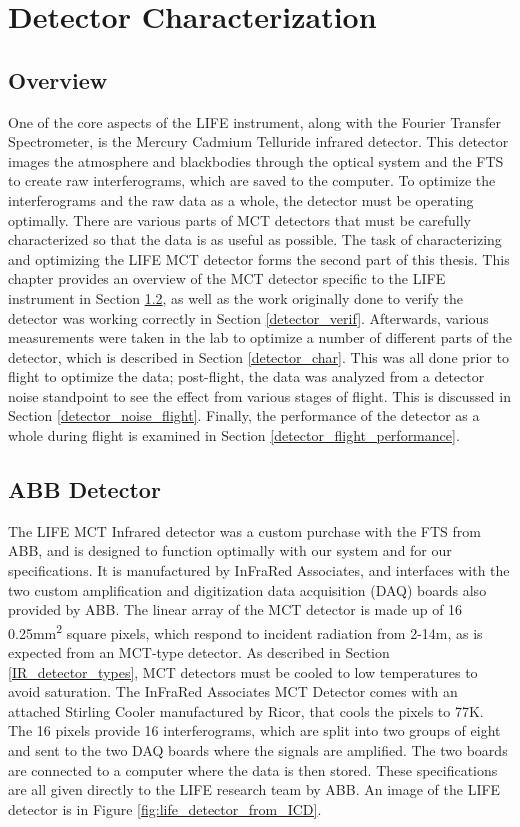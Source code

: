 \chapter{Detector Characterization} \label{detector}

\section{Overview}
One of the core aspects of the LIFE instrument, along with the Fourier Transfer Spectrometer, is the Mercury Cadmium Telluride infrared detector. This detector images the atmosphere and blackbodies through the optical system and the FTS to create raw interferograms, which are saved to the computer. To optimize the interferograms and the raw data as a whole, the detector must be operating optimally. There are various parts of MCT detectors that must be carefully characterized so that the data is as useful as possible. The task of characterizing and optimizing the LIFE MCT detector forms the second part of this thesis. This chapter provides an overview of the MCT detector specific to the LIFE instrument in Section \ref{ABB_detector}, as well as the work originally done to verify the detector was working correctly in Section \ref{detector_verif}. Afterwards, various measurements were taken in the lab to optimize a number of different parts of the detector, which is described in Section \ref{detector_char}. This was all done prior to flight to optimize the data; post-flight, the data was analyzed from a detector noise standpoint to see the effect from various stages of flight. This is discussed in Section \ref{detector_noise_flight}. Finally, the performance of the detector as a whole during flight is examined in Section \ref{detector_flight_performance}.

\section{ABB Detector}\label{ABB_detector}
The LIFE MCT Infrared detector was a custom purchase with the FTS from ABB, and is designed to function optimally with our system and for our specifications. It is manufactured by InFraRed Associates, and interfaces with the two custom amplification and digitization data acquisition (DAQ) boards also provided by ABB. The linear array of the MCT detector is made up of 16 0.25mm\textsuperscript{2} square pixels, which respond to incident radiation from 2-14\textmu m, as is expected from an MCT-type detector. As described in Section \ref{IR_detector_types}, MCT detectors must be cooled to low temperatures to avoid saturation. The InFraRed Associates MCT Detector comes with an attached Stirling Cooler manufactured by Ricor, that cools the pixels to 77K. The 16 pixels provide 16 interferograms, which are split into two groups of eight and sent to the two DAQ boards where the signals are amplified. The two boards are connected to a computer where the data is then stored. These specifications are all given directly to the LIFE research team by ABB. An image of the LIFE detector is in Figure \ref{fig:life_detector_from_ICD}.

